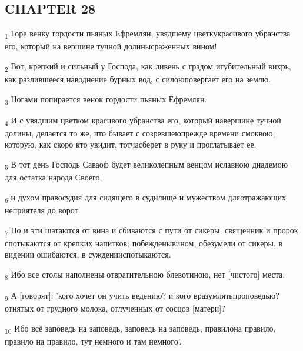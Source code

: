 \subsection{CHAPTER 28}
\begin{tcolorbox}
\textsubscript{1} Горе венку гордости пьяных Ефремлян, увядшему цветкукрасивого убранства его, который на вершине тучной долинысраженных вином!
\end{tcolorbox}
\begin{tcolorbox}
\textsubscript{2} Вот, крепкий и сильный у Господа, как ливень с градом игубительный вихрь, как разлившееся наводнение бурных вод, с силоюповергает его на землю.
\end{tcolorbox}
\begin{tcolorbox}
\textsubscript{3} Ногами попирается венок гордости пьяных Ефремлян.
\end{tcolorbox}
\begin{tcolorbox}
\textsubscript{4} И с увядшим цветком красивого убранства его, который навершине тучной долины, делается то же, что бывает с созревшеюпрежде времени смоквою, которую, как скоро кто увидит, тотчасберет в руку и проглатывает ее.
\end{tcolorbox}
\begin{tcolorbox}
\textsubscript{5} В тот день Господь Саваоф будет великолепным венцом иславною диадемою для остатка народа Своего,
\end{tcolorbox}
\begin{tcolorbox}
\textsubscript{6} и духом правосудия для сидящего в судилище и мужеством дляотражающих неприятеля до ворот.
\end{tcolorbox}
\begin{tcolorbox}
\textsubscript{7} Но и эти шатаются от вина и сбиваются с пути от сикеры; священник и пророк спотыкаются от крепких напитков; побежденывином, обезумели от сикеры, в видении ошибаются, в сужденииспотыкаются.
\end{tcolorbox}
\begin{tcolorbox}
\textsubscript{8} Ибо все столы наполнены отвратительною блевотиною, нет [чистого] места.
\end{tcolorbox}
\begin{tcolorbox}
\textsubscript{9} А [говорят]: 'кого хочет он учить ведению? и кого вразумлятьпроповедью? отнятых от грудного молока, отлученных от сосцов [матери]?
\end{tcolorbox}
\begin{tcolorbox}
\textsubscript{10} Ибо всё заповедь на заповедь, заповедь на заповедь, правилона правило, правило на правило, тут немного и там немного'.
\end{tcolorbox}
